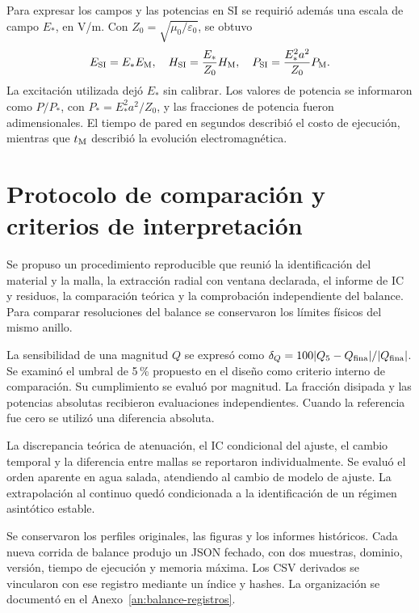 Para expresar los campos y las potencias en SI se requirió además una escala de campo $E_*$, en V/m. Con $Z_0=\sqrt{\mu_0/\varepsilon_0}$, se obtuvo
\begin{equation}
 E_{\rm SI}=E_*E_{\rm M},\quad H_{\rm SI}=\frac{E_*}{Z_0}H_{\rm M},\quad P_{\rm SI}=\frac{E_*^2a^2}{Z_0}P_{\rm M}.
\end{equation}
La excitación utilizada dejó $E_*$ sin calibrar. Los valores de potencia se informaron como $P/P_*$, con $P_*=E_*^2a^2/Z_0$, y las fracciones de potencia fueron adimensionales. El tiempo de pared en segundos describió el costo de ejecución, mientras que $t_{\rm M}$ describió la evolución electromagnética.

\section{Protocolo de comparación y criterios de interpretación}
Se propuso un procedimiento reproducible que reunió la identificación del material y la malla, la extracción radial con ventana declarada, el informe de IC y residuos, la comparación teórica y la comprobación independiente del balance. Para comparar resoluciones del balance se conservaron los límites físicos del mismo anillo.

La sensibilidad de una magnitud $Q$ se expresó como $\delta_Q=100|Q_5-Q_{\rm fina}|/|Q_{\rm fina}|$. Se examinó el umbral de 5\,\% propuesto en el diseño como criterio interno de comparación. Su cumplimiento se evaluó por magnitud. La fracción disipada y las potencias absolutas recibieron evaluaciones independientes. Cuando la referencia fue cero se utilizó una diferencia absoluta.

La discrepancia teórica de atenuación, el IC condicional del ajuste, el cambio temporal y la diferencia entre mallas se reportaron individualmente. Se evaluó el orden aparente en agua salada, atendiendo al cambio de modelo de ajuste. La extrapolación al continuo quedó condicionada a la identificación de un régimen asintótico estable.

Se conservaron los perfiles originales, las figuras y los informes históricos. Cada nueva corrida de balance produjo un JSON fechado, con dos muestras, dominio, versión, tiempo de ejecución y memoria máxima. Los CSV derivados se vincularon con ese registro mediante un índice y hashes. La organización se documentó en el Anexo~\ref{an:balance-registros}.
